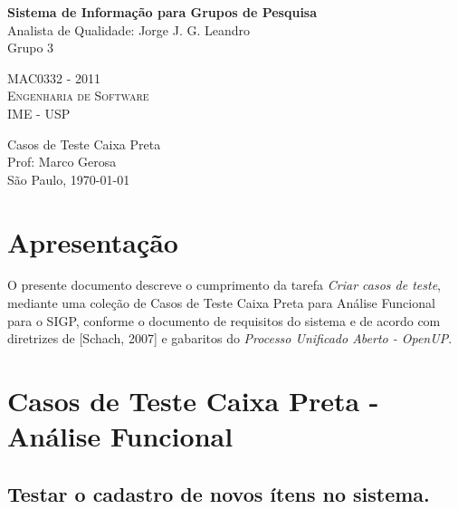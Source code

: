 \documentclass[11pt, a4paper]{book}
\begin{document}
\thispagestyle{empty}
\begin{center}
    \vspace*{0.2cm}
    \textbf{\Large{Sistema de Informação para Grupos de Pesquisa}}\\
	
    \vspace*{1.2cm}
    \Large{Analista de Qualidade: Jorge J. G. Leandro}\\
    \Large{Grupo 3}
    
    \vskip 2cm
	\textsc{
	MAC0332 - 2011\\[-0.25cm] 
          	Engenharia de Software\\[-0.25cm] 	
	IME - USP\\[-0.25cm]
	}
    
    \vskip 1.5cm
    Casos de Teste Caixa Preta\\
    Prof: Marco Gerosa\\

	
    \vskip 0.5cm
   {\normalsize São Paulo, \today}
\end{center}


\chapter[Apresentação]{Apresentação}
\label{cap:apresentacao}	
	
	 	O presente documento descreve o cumprimento da tarefa \emph{Criar casos de teste}, mediante uma coleção de Casos de Teste Caixa Preta para Análise Funcional para o SIGP, conforme o documento de requisitos do sistema e de acordo com diretrizes de [Schach, 2007] e gabaritos do \emph{Processo Unificado Aberto - OpenUP}.

\chapter[Casos de Teste]{Casos de Teste Caixa Preta - Análise Funcional}
\label{cap:casosdeteste}

\section{Testar o cadastro de novos ítens no sistema.}
\end{document}
